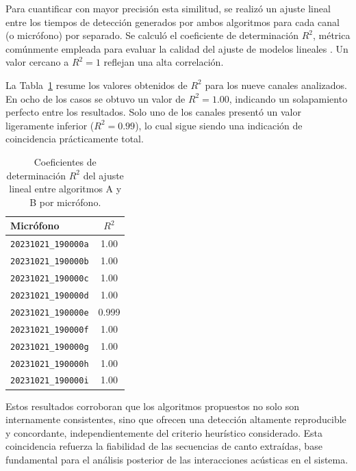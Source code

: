 Para cuantificar con mayor precisión esta similitud, se realizó 
un ajuste lineal entre los tiempos de detección generados por 
ambos algoritmos para cada canal (o micrófono) por separado. Se 
calculó el coeficiente de determinación \( R^2 \), métrica 
comúnmente empleada para evaluar la calidad del ajuste de 
modelos lineales \cite{nagelkerke1991note}. Un valor cercano a 
\( R^2 = 1 \) reflejan una alta correlación.

La Tabla~\ref{tab:r2_results} resume los valores obtenidos de 
\( R^2 \) para los nueve canales analizados. En ocho de los 
casos se obtuvo un valor de \( R^2 = 1.00 \), indicando un 
solapamiento perfecto entre los resultados. Solo uno de los 
canales presentó un valor ligeramente inferior (\( R^2 = 0.99 \)), 
lo cual sigue siendo una indicación de coincidencia 
prácticamente total.

\begin{table}[ht]
    \centering
    \caption{Coeficientes de determinación \( R^2 \) del ajuste lineal entre algoritmos A y B por micrófono.}
    \label{tab:r2_results}
    \begin{tabular}{lc}
        \toprule
        \textbf{Micrófono} & \textbf{\( R^2 \)} \\
        \midrule
        \texttt{20231021\_190000a} & 1.00 \\
        \texttt{20231021\_190000b} & 1.00 \\
        \texttt{20231021\_190000c} & 1.00 \\
        \texttt{20231021\_190000d} & 1.00 \\
        \texttt{20231021\_190000e} & 0.999 \\
        \texttt{20231021\_190000f} & 1.00 \\
        \texttt{20231021\_190000g} & 1.00 \\
        \texttt{20231021\_190000h} & 1.00 \\
        \texttt{20231021\_190000i} & 1.00 \\
        \bottomrule
    \end{tabular}
\end{table}

Estos resultados corroboran que los algoritmos propuestos no 
solo son internamente consistentes, sino que ofrecen una 
detección altamente reproducible y concordante, 
independientemente del criterio heurístico considerado. 
Esta coincidencia refuerza la fiabilidad de las secuencias de 
canto extraídas, base fundamental para el análisis posterior de 
las interacciones acústicas en el sistema.

